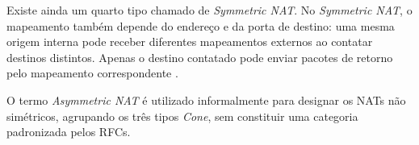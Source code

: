 Existe ainda um quarto tipo chamado de \textit{Symmetric NAT}. No \textit{Symmetric NAT}, o mapeamento também depende do endereço e da porta de destino: uma mesma origem interna pode receber diferentes mapeamentos externos ao contatar destinos distintos. Apenas o destino contatado pode enviar pacotes de retorno pelo mapeamento correspondente \citep{RFC3489}.

O termo \textit{Asymmetric NAT} é utilizado informalmente para designar os NATs não simétricos, agrupando os três tipos \textit{Cone}, sem constituir uma categoria padronizada pelos RFCs.


